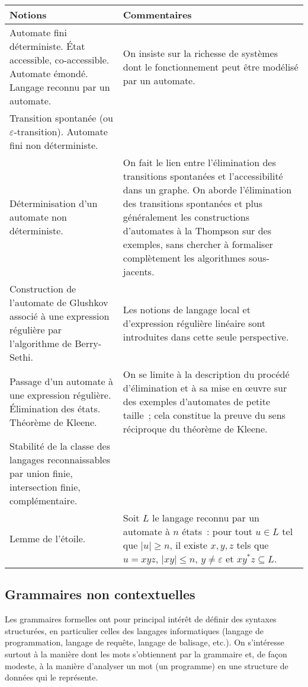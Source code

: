 \noindent
\begin{longtable}{|p{\lnotion}|p{\comment}|}
    \hline
    \textbf{Notions} & \textbf{Commentaires} \\
    \hline \hline
    Automate fini déterministe. \'Etat accessible, co-accessible. Automate émondé. Langage reconnu par un automate.
    &
    On insiste sur la richesse de systèmes dont le fonctionnement peut être modélisé par un automate.
   \\ \hline
    Transition spontanée (ou $\varepsilon$-transition). Automate fini non déterministe.&
    \\ 
    \hline
    Déterminisation d'un automate non déterministe.
    & On fait le lien entre l'élimination des transitions spontanées et l'accessibilité dans un graphe. On aborde l'élimination des transitions spontanées et plus généralement les constructions d'automates à la Thompson sur des exemples, sans chercher à formaliser complètement les algorithmes sous-jacents.
    \\
    \hline
    Construction de l'automate de Glushkov associé à une expression régulière par l'algorithme de Berry-Sethi.
    & Les notions de langage local et d'expression régulière linéaire sont introduites dans cette seule perspective.
    \\ \hline
    Passage d'un automate à une expression régulière. Élimination des états. Théorème de Kleene.
    & On se limite à la description du procédé d'élimination et à sa mise en œuvre sur des exemples d'automates de petite taille~; cela constitue la preuve du sens réciproque du théorème de Kleene.
    \\ \hline
     Stabilité de la classe des langages reconnaissables par union finie, intersection finie, complémentaire. & \\ \hline
    Lemme de l'étoile. & Soit $L$ le langage reconnu par un automate à $n$ états~: pour tout $u\in L$ tel que $|u|\geq n$, il existe $x,y,z$ tels que $u=xyz$, $|xy|\leq n$, $y\neq\varepsilon$ et $xy^*z\subseteq L$.
    \\ 
    \hline
\end{longtable}


\subsection{Grammaires non contextuelles}

Les grammaires formelles ont pour principal intérêt de définir des syntaxes structurées, en particulier celles des langages informatiques (langage de programmation, langage de requête, langage de balisage, etc.). On s'intéresse surtout à la manière dont les mots s'obtiennent par la grammaire et, de façon modeste, à la manière d'analyser un mot (un programme) en une structure de données qui le représente.

